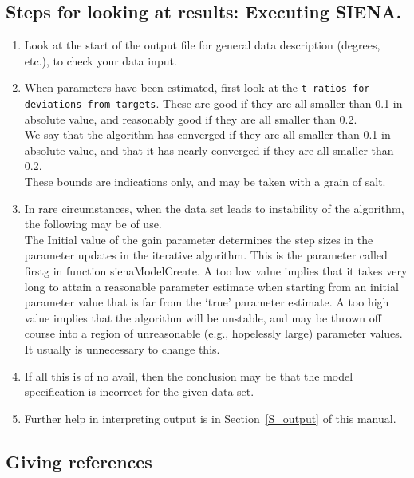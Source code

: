 \documentclass[a4paper,fleqn]{article}
\newcommand{\+}{\, + \,}
\newcommand{\si}{{\sf SIENA}}
\begin{document}
{\subsection{Steps for looking at results: Executing \si .}
\label{S_exec}

\begin{enumerate}
\item Look at the start of the output file for general data
      description (degrees, etc.), to check your data input.
    \item When parameters have been estimated, first look at the \texttt{t
        ratios for deviations from targets}.  These are good if they are all
      smaller than 0.1 in absolute
      value, and reasonably good if they are all smaller than 0.2.\\
      We say that the algorithm has converged if they are all smaller than 0.1
      in absolute value, and that it has nearly converged if they are all
      smaller than 0.2.\\
      These bounds are indications only, and may be taken with a grain of
      salt.
\item In rare circumstances, when the data set leads to instability
      of the algorithm, the following may be of use.\\
      The \textsf{Initial value of the gain parameter} determines the
      step sizes in the parameter updates in the iterative
      algorithm.
      This is the parameter called \textsf{firstg}
      in function \textsf{sienaModelCreate}.
      A too low value implies that it takes very long to attain a
      reasonable parameter estimate when starting from an initial
      parameter value that is far from the `true' parameter estimate.
      A too high value implies that the algorithm will be unstable,
      and may be thrown off course into a region of unreasonable
      (e.g., hopelessly large) parameter values.\\
      It usually is unnecessary to change
      this.
    \item If all this is of no avail, then the conclusion may be that the model
      specification is incorrect for the given data set.
    \item Further help in interpreting output is in Section~\ref{S_output} of
      this manual.
\end{enumerate}

\newpage
\subsection{Giving references}

}
\end{document}
